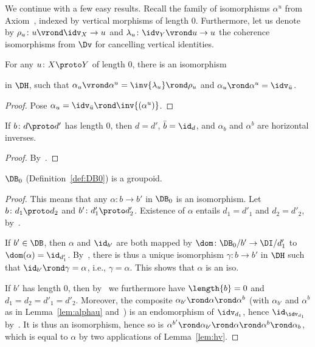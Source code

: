 \documentclass{LMCS}
\theoremstyle{plain}\newtheorem{satz}[thm]{Satz}
\begin{document}
We continue with a few easy results.  Recall the family of isomorphisms
$\alpha^u$ from Axiom~, indexed by vertical morphisms
of length $0$.  Furthermore, let us denote by $\rho_u \colon u \vrond
\idv_X \to u$ and $\lambda_u \colon \idv_Y \vrond u \to u$ the
coherence isomorphisms from $\Dv$ for cancelling vertical identities.
\begin{lem}\label{lem:alphau}
  For any $u \colon X \proto Y$ of length $0$, there is an isomorphism
  \begin{mathpar}
  \end{mathpar}
  in $\DH$, such that $\alpha_u \vrond \alpha^u = \inv{\lambda_u}
  \rond \rho_u$ and $\alpha_u \rond \alpha^u = \idv_{\bar{u}}$.
\end{lem}
\begin{proof}
  Pose $\alpha_u = \idv_{\bar{u}} \rond \inv{(\alpha^u)}$.
\end{proof}
\begin{lem}\label{lem:hv}
  If $b \colon d \proto d'$ has length $0$, then $d = d'$, $\bar{b} =
  \id_d$, and $\alpha_b$ and $\alpha^b$ are horizontal inverses.
\end{lem}
\begin{proof}
  By~.
\end{proof}

\begin{lem}\label{lem:B0isos}
  $\DB_0$ (Definition~\ref{def:DB0}) is a groupoid.
\end{lem}
\begin{proof}
  This means that any $\alpha \colon b \to b'$ in $\DB_0$ is an
  isomorphism.  Let $b \colon d_1 \proto d_2$ and $b' \colon d'_1
  \proto d'_2$. Existence of $\alpha$ entails $d_1 = d'_1$ and $d_2 =
  d'_2$, by~.

  If $b' \in \DB$, then $\alpha$ and $\id_{b'}$ are both
  mapped by $\dom \colon \DB_0 / b' \to \DI / d'_1$ to $\dom(\alpha) =
  \id_{d'_1}$. By~, there is thus a unique
  isomorphism $\gamma \colon b \to b'$ in $\DH$ such that $\id_{b'}
  \rond \gamma = \alpha$, i.e., $\gamma = \alpha$. This shows that
  $\alpha$ is an iso.
  
  If $b'$ has length $0$, then by~ we furthermore
  have $\length{b} = 0$ and $d_1 = d_2 = d'_1 = d'_2$. Moreover, the
  composite $\alpha_{b'} \rond \alpha \rond \alpha^b$ (with
  $\alpha_{b'}$ and $\alpha^{b}$ as in Lemma~\ref{lem:alphau}
  and~) is an endomorphism of $\idv_{d_1}$, hence
  $\id_{\idv_{d_1}}$ by~.  It is thus an
  isomorphism, hence so is $\alpha^{b'} \rond \alpha_{b'} \rond \alpha
  \rond \alpha^b \rond \alpha_b$, which is equal to $\alpha$
  by two applications of Lemma~\ref{lem:hv}.
\end{proof}
\end{document}
